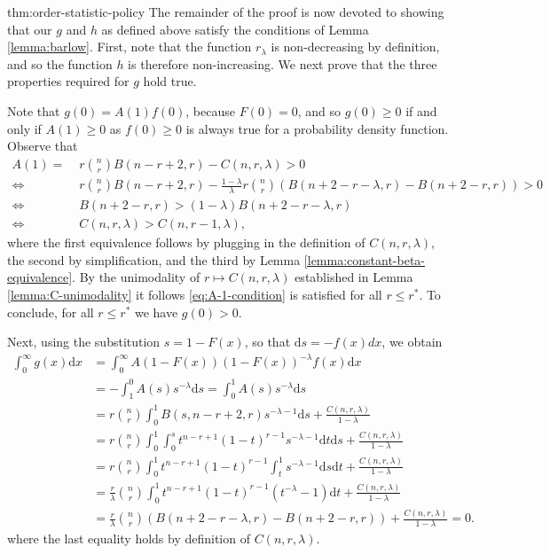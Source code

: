 \documentclass[11pt]{article}
\newcommand{\dd}{\mathrm{d}}
\begin{document}
\begin{cleverproof}{thm:order-statistic-policy}
\noindent The remainder of the proof is now devoted to showing that our $g$ and $h$ as defined above satisfy the conditions of Lemma \ref{lemma:barlow}. First, note that the function $r_{\lambda}$ is non-decreasing by definition, and so the function $h$ is therefore non-increasing. We next prove that the three properties required for $g$ hold true.

Note that $g(0) = A(1)f(0)$, because $F(0) = 0$, and so $g(0) \geq 0$ if and only if $A(1) \geq 0$ as $f(0) \geq 0$ is always true for a probability density function. Observe that
    \begin{align}
    \label{eq:A-1-condition}
        A(1)  = \; &r\binom{n}{r}B(n-r+2,r)-C(n,r,\lambda)>0\nonumber\\
        \iff \; &r\binom{n}{r}B(n-r+2,r)-\frac{1-\lambda}{\lambda}r\binom{n}{r}\left(B(n+2-r-\lambda, r)-B(n+2-r, r)\right)>0\nonumber\\
        \iff \; &B(n+2-r,r) > (1-\lambda)B(n+2-r-\lambda,r)\nonumber\\
        \iff \; &C(n,r,\lambda) > C(n,r-1,\lambda),
    \end{align}
where the first equivalence follows by plugging in the definition of $C(n,r,\lambda)$, the second by simplification, and the third by Lemma \ref{lemma:constant-beta-equivalence}. By the unimodality of $r \mapsto C(n,r,\lambda)$ established in Lemma \ref{lemma:C-unimodality} it follows \eqref{eq:A-1-condition} is satisfied for all $r \leq r^*$. To conclude, for all $r \leq r^*$ we have $g(0) > 0$.

Next, using the substitution $s = 1 - F(x)$, so that $\mathrm{d}s = -f(x)dx$, we obtain
    \begin{align*}
        \int_0^\infty g(x)\dd x&=\int_0^\infty A(1-F(x))(1-F(x))^{-\lambda}f(x) \dd x\\
        &= - \int_1^0 A(s)s^{-\lambda} \dd s
        = \int_0^1 A(s)s^{-\lambda} \dd s\\
        &= r\binom{n}{r}\int_0^1 B(s,n-r+2,r)s^{-\lambda-1} \dd s+\frac{C(n,r,\lambda)}{1-\lambda}\\
        &= r\binom{n}{r}\int_0^1 \int_0^s t^{n-r+1}(1-t)^{r-1}s^{-\lambda-1}\dd t \dd s+\frac{C(n,r,\lambda)}{1-\lambda}\\
        &= r\binom{n}{r}\int_0^1  t^{n-r+1}(1-t)^{r-1}\int_t^1s^{-\lambda-1}\dd s \dd t+\frac{C(n,r,\lambda)}{1-\lambda}\\
        &= \frac{r}{\lambda}\binom{n}{r}\int_0^1  t^{n-r+1}(1-t)^{r-1}(t^{-\lambda}-1)\dd t+\frac{C(n,r,\lambda)}{1-\lambda}\\
        &= \frac{r}{\lambda}\binom{n}{r}\left(B(n+2-r-\lambda, r)-B(n+2-r, r)\right)+\frac{C(n,r,\lambda)}{1-\lambda}=0.
    \end{align*}
where the last equality holds by definition of $C(n,r,\lambda)$.


\end{cleverproof}
\end{document}
